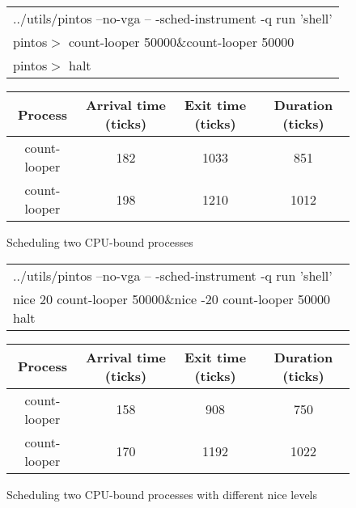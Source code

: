 \documentclass{article}
\newcommand{\command}[1]{{\sffamily#1}}
\begin{document}
\begin{landscape}
\begin{figure}
\centering

\begin{tabular}{l}
\command{../utils/pintos --no-vga -- -sched-instrument -q run 'shell'} \\
\command{pintos$>$ count-looper 50000\&count-looper 50000} \\
\command{pintos$>$ halt}
\end{tabular}



\vspace{1em}

\begin{tabular}{cccc}\toprule
Process & Arrival time (ticks) & Exit time (ticks) & Duration (ticks)\\\hline
\command{count-looper} & \num{182} & \num{1033} & \num{851} \\\bottomrule
\command{count-looper} & \num{198} & \num{1210} & \num{1012} \\\bottomrule
\end{tabular}
\caption{Scheduling two CPU-bound processes}
\label{fig:twoCpuBound}
\end{figure}
\end{landscape}

\begin{landscape}
\begin{figure}
\centering

\begin{tabular}{l}
\command{../utils/pintos --no-vga -- -sched-instrument -q run 'shell'} \\
\command{nice 20 count-looper 50000\&nice -20 count-looper 50000}
\command{halt}
\end{tabular}

\vspace{1em}



\vspace{1em}

\begin{tabular}{cccc}\toprule
Process & Arrival time (ticks) & Exit time (ticks) & Duration (ticks)\\\hline
\command{count-looper} & \num{158} & \num{908} & \num{750} \\\bottomrule
\command{count-looper} & \num{170} & \num{1192} & \num{1022} \\\bottomrule
\end{tabular}
\caption{Scheduling two CPU-bound processes with different nice levels}
\label{fig:niceCpuBound}
\end{figure}
\end{landscape}
\end{document}
